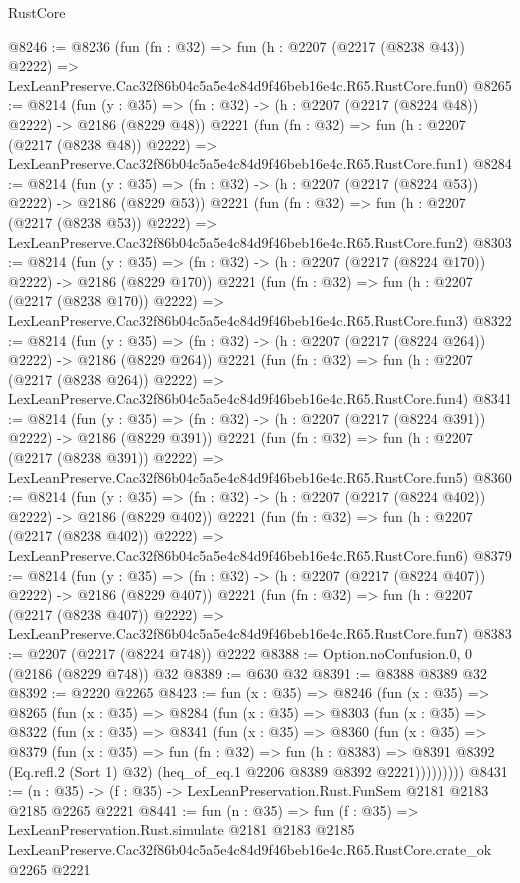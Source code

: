 \begin{lexlean}{RustCore}
\begin{coremodule}
@8246 := @8236
    (fun (fn : @32) =>
    fun (h : @2207 (@2217 (@8238 @43)) @2222) =>
    LexLeanPreserve.Cac32f86b04c5a5e4c84d9f46beb16e4c.R65.RustCore.fun0)
@8265 := @8214
    (fun (y : @35) => (fn : @32) -> (h : @2207 (@2217 (@8224 @48)) @2222) -> @2186 (@8229 @48))
    @2221
    (fun (fn : @32) =>
    fun (h : @2207 (@2217 (@8238 @48)) @2222) =>
    LexLeanPreserve.Cac32f86b04c5a5e4c84d9f46beb16e4c.R65.RustCore.fun1)
@8284 := @8214
    (fun (y : @35) => (fn : @32) -> (h : @2207 (@2217 (@8224 @53)) @2222) -> @2186 (@8229 @53))
    @2221
    (fun (fn : @32) =>
    fun (h : @2207 (@2217 (@8238 @53)) @2222) =>
    LexLeanPreserve.Cac32f86b04c5a5e4c84d9f46beb16e4c.R65.RustCore.fun2)
@8303 := @8214
    (fun (y : @35) => (fn : @32) -> (h : @2207 (@2217 (@8224 @170)) @2222) -> @2186 (@8229 @170))
    @2221
    (fun (fn : @32) =>
    fun (h : @2207 (@2217 (@8238 @170)) @2222) =>
    LexLeanPreserve.Cac32f86b04c5a5e4c84d9f46beb16e4c.R65.RustCore.fun3)
@8322 := @8214
    (fun (y : @35) => (fn : @32) -> (h : @2207 (@2217 (@8224 @264)) @2222) -> @2186 (@8229 @264))
    @2221
    (fun (fn : @32) =>
    fun (h : @2207 (@2217 (@8238 @264)) @2222) =>
    LexLeanPreserve.Cac32f86b04c5a5e4c84d9f46beb16e4c.R65.RustCore.fun4)
@8341 := @8214
    (fun (y : @35) => (fn : @32) -> (h : @2207 (@2217 (@8224 @391)) @2222) -> @2186 (@8229 @391))
    @2221
    (fun (fn : @32) =>
    fun (h : @2207 (@2217 (@8238 @391)) @2222) =>
    LexLeanPreserve.Cac32f86b04c5a5e4c84d9f46beb16e4c.R65.RustCore.fun5)
@8360 := @8214
    (fun (y : @35) => (fn : @32) -> (h : @2207 (@2217 (@8224 @402)) @2222) -> @2186 (@8229 @402))
    @2221
    (fun (fn : @32) =>
    fun (h : @2207 (@2217 (@8238 @402)) @2222) =>
    LexLeanPreserve.Cac32f86b04c5a5e4c84d9f46beb16e4c.R65.RustCore.fun6)
@8379 := @8214
    (fun (y : @35) => (fn : @32) -> (h : @2207 (@2217 (@8224 @407)) @2222) -> @2186 (@8229 @407))
    @2221
    (fun (fn : @32) =>
    fun (h : @2207 (@2217 (@8238 @407)) @2222) =>
    LexLeanPreserve.Cac32f86b04c5a5e4c84d9f46beb16e4c.R65.RustCore.fun7)
@8383 := @2207 (@2217 (@8224 @748)) @2222
@8388 := Option.noConfusion.{0, 0} (@2186 (@8229 @748)) @32
@8389 := @630 @32
@8391 := @8388 @8389 @32
@8392 := @2220 @2265
@8423 := fun (x : @35) =>
  @8246
    (fun (x : @35) =>
    @8265
      (fun (x : @35) =>
      @8284
        (fun (x : @35) =>
        @8303
          (fun (x : @35) =>
          @8322
            (fun (x : @35) =>
            @8341
              (fun (x : @35) =>
              @8360
                (fun (x : @35) =>
                @8379
                  (fun (x : @35) =>
                  fun (fn : @32) =>
                  fun (h : @8383) =>
                  @8391
                    @8392
                    (Eq.refl.{2} (Sort 1) @32)
                    (heq_of_eq.{1} @2206 @8389 @8392 @2221)))))))))
@8431 := (n : @35) -> (f : @35) -> LexLeanPreservation.Rust.FunSem @2181 @2183 @2185 @2265 @2221
@8441 := fun (n : @35) =>
  fun (f : @35) =>
  LexLeanPreservation.Rust.simulate
    @2181
    @2183
    @2185
    LexLeanPreserve.Cac32f86b04c5a5e4c84d9f46beb16e4c.R65.RustCore.crate_ok
    @2265
    @2221
\end{coremodule}
\end{lexlean}
